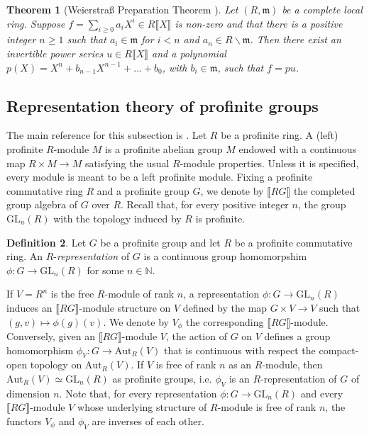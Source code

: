 \documentclass[a4paper,10pt]{amsart}
\theoremstyle{plain}
\newtheorem{thm}{Theorem}[section]
\theoremstyle{definition}
\newtheorem{definition}[thm]{Definition}
\newcommand{\bbN}{\mathbb{N}}
\numberwithin{equation}{section}
\begin{document}
\begin{thm}[{{Weierstra\ss{} Preparation Theorem \cite[Ch. VII \S 3, Prop.~6]{bourbaki1972}}}]\label{thm:weierstrass}
    Let $(R,\mathfrak m)$ be a complete local ring. Suppose $f = \sum_{i\geq 0} a_iX^i \in R\llbracket X \rrbracket$ is non-zero and that there is a positive integer $n \geq 1$ such that $a_i \in \mathfrak m$ for $i < n$ and $a_n \in R\smallsetminus \mathfrak m$. Then there exist an invertible power series $u \in R \llbracket X \rrbracket$ and a polynomial $p (X) = X^n+b_{n-1}X^{n-1}+\ldots+b_0$, with $b_i 
    \in \mathfrak m$, such that $f=pu$.
\end{thm}

\subsection{Representation theory of profinite groups} 

    The main reference for this subsection is \cite[Ch.~5-6]{RZ10}. Let $R$ be a profinite ring. A (left) profinite $R$-module $M$ is a profinite abelian group $M$ endowed with a continuous map $R\times M\to M$ satisfying the usual $R$-module properties. Unless it is specified, every module is meant to be a left profinite module.
	Fixing a profinite commutative ring $R$ and a profinite group $G$, we denote by $\llbracket RG \rrbracket$ the completed group algebra of $G$ over $R$. Recall that, for every positive integer $n$, the group $\mathrm{GL}_n(R)$ with the topology induced by $R$ is profinite. 
	\begin{definition}
		Let $G$ be a profinite group and let $R$ be a profinite commutative ring. An $R$-\emph{representation} of $G$ is a continuous group homomorpshim $\phi\colon G\to \mathrm{GL}_n(R)$ for some $n\in\bbN$.
	\end{definition}
	If $V=R^n$ is the free $R$-module of rank $n$, a representation $\phi\colon G\to \mathrm{GL}_n(R)$ induces an $\llbracket RG \rrbracket$-module structure on $V$ defined by the map $G\times V\to V$ such that $(g,v)\mapsto \phi(g)(v)$. We denote by $V_\phi$ the corresponding $\llbracket RG\rrbracket$-module. Conversely, given an $\llbracket RG \rrbracket$-module $V$, the action of $G$ on $V$ defines a group homomorphism $\phi_V\colon G\to\mathrm{Aut}_R(V)$ that is continuous with respect the compact-open topology on $\mathrm{Aut}_R(V)$. If $V$ is free of rank $n$ as an $R$-module, then $\mathrm{Aut}_R(V)\simeq \mathrm{GL}_n(R)$ as profinite groups, i.e. $\phi_V$ is an $R$-representation of $G$ of dimension $n$. Note that, for every representation $\phi\colon G\to \mathrm{GL}_n(R)$ and every $\llbracket RG \rrbracket$-module $V$ whose underlying structure of $R$-module is free of rank $n$, the functors $V_\phi$ and $\phi_V$ are inverses of each other.
    
\end{document}
